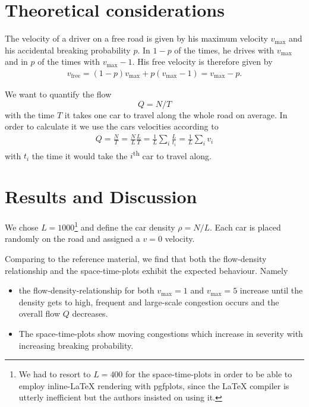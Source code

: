 \documentclass[aps,pra,showpacs,preprintnumbers,amsmath,amssymb,nofootinbib]{revtex4-2}
\begin{document}
    \section{Theoretical considerations}

    The velocity of a driver on a free road is given by his maximum velocity $v_{\mathrm{max}}$ and his accidental breaking probability $p$.
    In $1-p$ of the times, he drives with $v_{\mathrm{max}}$ and in $p$ of the times with $v_{\mathrm{max}} - 1$.
    His free velocity is therefore given by 
    \begin{align*}
        v_{\mathrm{free}} = (1 - p) v_{\mathrm{max}} + p (v_{\mathrm{max}} - 1) = v_{\mathrm{max}} - p.
    \end{align*}

    We want to quantify the flow \[Q = N / T\] with the time $T$ it takes one car  to travel along the whole road on average. 
    In order to calculate it we use the cars velocities according to
    \begin{align*}
        Q = \frac{N}{T} = \frac{N}{L} \frac{L}{T} = \frac{1}{L} \sum_i \frac{L}{t_i} = \frac{1}{L} \sum_i v_i
    \end{align*}
    with $t_i$ the time it would take the $i$\textsuperscript{th} car to travel along.

    \section{Results and Discussion}

    We chose $L = 1000$\footnote{We had to resort to $L = 400$ for the space-time-plots in order to be able to employ inline-\LaTeX{} rendering with pgfplots, since the \LaTeX{} compiler is utterly inefficient but the authors insisted on using it.} and define the car density $\rho = N / L$.
    Each car is placed randomly on the road and assigned a $v = 0$ velocity.

    Comparing to the reference material, we find that both the flow-density relationship and the space-time-plots exhibit the expected behaviour.
    Namely
    \begin{itemize}
        \item the flow-density-relationship for both $v_{\mathrm{max}} = 1$ and $v_{\mathrm{max}} = 5$ increase until the density gets to high, frequent and large-scale congestion occurs and the overall flow $Q$ decreases.
        \item The space-time-plots show moving congestions which increase in severity with increasing breaking probability.
    \end{itemize}
   
\end{document}
